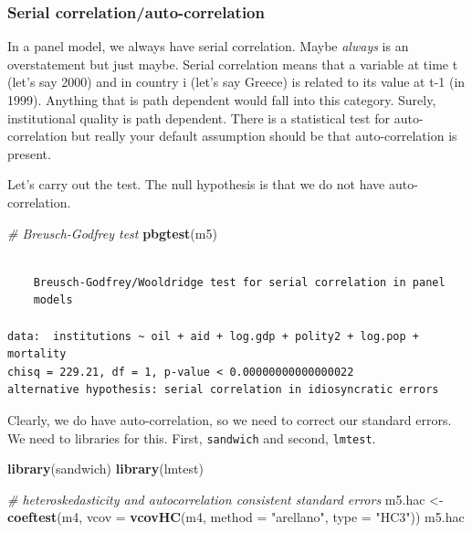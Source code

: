 \documentclass[]{article}
\newenvironment{Shaded}{\begin{snugshade}}{\end{snugshade}}
\newcommand{\KeywordTok}[1]{\textcolor[rgb]{0.13,0.29,0.53}{\textbf{#1}}}
\newcommand{\DataTypeTok}[1]{\textcolor[rgb]{0.13,0.29,0.53}{#1}}
\newcommand{\StringTok}[1]{\textcolor[rgb]{0.31,0.60,0.02}{#1}}
\newcommand{\CommentTok}[1]{\textcolor[rgb]{0.56,0.35,0.01}{\textit{#1}}}
\newcommand{\NormalTok}[1]{#1}
\theoremstyle{definition}
\theoremstyle{definition}
\theoremstyle{definition}
\theoremstyle{remark}
\begin{document}
\subsubsection{Serial
correlation/auto-correlation}\label{serial-correlationauto-correlation}

In a panel model, we always have serial correlation. Maybe \emph{always}
is an overstatement but just maybe. Serial correlation means that a
variable at time t (let's say 2000) and in country i (let's say Greece)
is related to its value at t-1 (in 1999). Anything that is path
dependent would fall into this category. Surely, institutional quality
is path dependent. There is a statistical test for auto-correlation but
really your default assumption should be that auto-correlation is
present.

Let's carry out the test. The null hypothesis is that we do not have
auto-correlation.

\begin{Shaded}
\begin{Highlighting}[]
\CommentTok{# Breusch-Godfrey test}
\KeywordTok{pbgtest}\NormalTok{(m5)}
\end{Highlighting}
\end{Shaded}

\begin{verbatim}

    Breusch-Godfrey/Wooldridge test for serial correlation in panel
    models

data:  institutions ~ oil + aid + log.gdp + polity2 + log.pop + mortality
chisq = 229.21, df = 1, p-value < 0.00000000000000022
alternative hypothesis: serial correlation in idiosyncratic errors
\end{verbatim}

Clearly, we do have auto-correlation, so we need to correct our standard
errors. We need to libraries for this. First, \texttt{sandwich} and
second, \texttt{lmtest}.

\begin{Shaded}
\begin{Highlighting}[]
\KeywordTok{library}\NormalTok{(sandwich)}
\KeywordTok{library}\NormalTok{(lmtest)}

\CommentTok{# heteroskedasticity and autocorrelation consistent standard errors}
\NormalTok{m5.hac <-}\StringTok{ }\KeywordTok{coeftest}\NormalTok{(m4, }\DataTypeTok{vcov =} \KeywordTok{vcovHC}\NormalTok{(m4, }\DataTypeTok{method =} \StringTok{"arellano"}\NormalTok{, }\DataTypeTok{type =} \StringTok{"HC3"}\NormalTok{))}
\NormalTok{m5.hac}
\end{Highlighting}
\end{Shaded}
\end{document}
